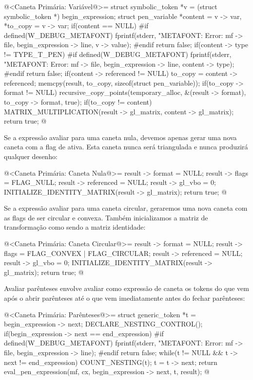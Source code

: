 {\iniciocodigo
@<Caneta Primária: Variável@>=
struct symbolic_token *v = (struct symbolic_token *) begin_expression;
struct pen_variable *content = v -> var, *to_copy = v -> var;
if(content == NULL){
#if defined(W_DEBUG_METAFONT)
  fprintf(stderr, "METAFONT: Error: %
          mf -> file, begin_expression -> line, v -> value);
#endif
  return false;
}
if(content -> type != TYPE_T_PEN){
#if defined(W_DEBUG_METAFONT)
  fprintf(stderr, "METAFONT: Error: %
          mf -> file, begin_expression -> line, content -> type);
#endif
  return false;
}
if(content -> referenced != NULL)
  to_copy = content -> referenced;
memcpy(result, to_copy, sizeof(struct pen_variable));
if(to_copy -> format != NULL)
  recursive_copy_points(temporary_alloc, &(result -> format),
                        to_copy -> format, true);
if(to_copy != content)
  MATRIX_MULTIPLICATION(result -> gl_matrix, content -> gl_matrix);
return true;
@
\fimcodigo

Se a expressão avaliar para uma caneta nula, devemos apenas gerar uma
nova caneta com a flag de  ativa. Esta caneta
nunca será triangulada e nunca produzirá qualquer desenho:

\iniciocodigo
@<Caneta Primária: Caneta Nula@>=
result -> format = NULL;
result -> flags = FLAG_NULL;
result -> referenced = NULL;
result -> gl_vbo = 0;
INITIALIZE_IDENTITY_MATRIX(result -> gl_matrix);
return true;
@
\fimcodigo

Se a expressão avaliar para uma caneta circular, geraremos uma nova
caneta com as flags de ser circular e convexa. Também inicializamos a
matriz de transformação como sendo a matriz identidade:

\iniciocodigo
@<Caneta Primária: Caneta Circular@>=
result -> format = NULL;
result -> flags = FLAG_CONVEX | FLAG_CIRCULAR;
result -> referenced = NULL;
result -> gl_vbo = 0;
INITIALIZE_IDENTITY_MATRIX(result -> gl_matrix);
return true;
@
\fimcodigo

Avaliar parênteses envolve avaliar como expressão de caneta os tokens
do que vem após o abrir parênteses até o que vem imediatamente antes
do fechar parênteses:

\iniciocodigo
@<Caneta Primária: Parênteses@>=
struct generic_token *t = begin_expression -> next;
DECLARE_NESTING_CONTROL();
if(begin_expression -> next == end_expression){
#if defined(W_DEBUG_METAFONT)
  fprintf(stderr, "METAFONT: Error: %
          mf -> file, begin_expression -> line);
#endif
  return false;
}
while(t != NULL && t -> next != end_expression){
  COUNT_NESTING(t);
  t = t -> next;
}
return eval_pen_expression(mf, cx, begin_expression -> next, t, result);
@
\fimcodigo

}
